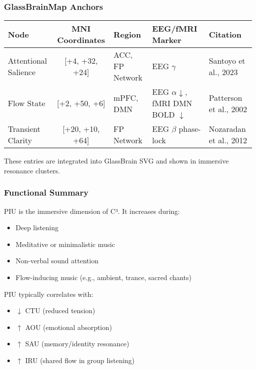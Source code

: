 \documentclass[10pt]{article}
\begin{document}
\subsubsection*{GlassBrainMap Anchors}

\begin{center}
\begin{tabular}{|l|c|l|l|l|}
\hline
\textbf{Node} & \textbf{MNI Coordinates} & \textbf{Region} & \textbf{EEG/fMRI Marker} & \textbf{Citation} \\
\hline
Attentional Salience & [+4, +32, +24] & ACC, FP Network & EEG $\gamma$ & Santoyo et al., 2023 \\
Flow State & [+2, +50, +6] & mPFC, DMN & EEG $\alpha \downarrow$, fMRI DMN BOLD $\downarrow$ & Patterson et al., 2002 \\
Transient Clarity & [+20, +10, +64] & FP Network & EEG $\beta$ phase-lock & Nozaradan et al., 2012 \\
\hline
\end{tabular}
\end{center}

These entries are integrated into GlassBrain SVG and shown in immersive resonance clusters.

\subsubsection*{Functional Summary}

PIU is the immersive dimension of C³. It increases during:

\begin{itemize}
    \item Deep listening
    \item Meditative or minimalistic music
    \item Non-verbal sound attention
    \item Flow-inducing music (e.g., ambient, trance, sacred chants)
\end{itemize}

PIU typically correlates with:

\begin{itemize}
    \item $\downarrow$ CTU (reduced tension)
    \item $\uparrow$ AOU (emotional absorption)
    \item $\uparrow$ SAU (memory/identity resonance)
    \item $\uparrow$ IRU (shared flow in group listening)
\end{itemize}
\end{document}
